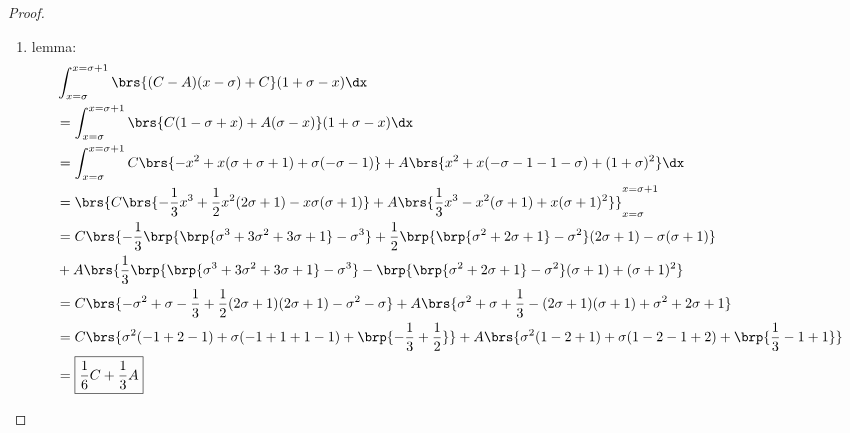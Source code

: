 \begin{proof}
\begin{enumerate}
  \item lemma: \label{ilem:stromberg_CA} 
    \begin{align*}
        &\int_{x=\sigma}^{x=\sigma+1}   \brs{ (C-A)(x-\sigma)+C           } (1+\sigma-x)    \dx
    \\&= \int_{x=\sigma}^{x=\sigma+1}   \brs{ C(1-\sigma+x) + A(\sigma-x) } (1+\sigma-x)    \dx
    \\&= \int_{x=\sigma}^{x=\sigma+1}  C\brs{-x^2 +  x(\sigma+\sigma+1) + \sigma(-\sigma-1)    } 
                                     + A\brs{ x^2 +  x(-\sigma-1-1-\sigma) + (1+\sigma)^2} \dx
    \\&= \brs{ C\brs{-\frac{1}{3}x^3 + \frac{1}{2} x^2(2\sigma+1) - x\sigma(\sigma+1)}
              +A\brs{ \frac{1}{3}x^3 -             x^2( \sigma+1) + x(\sigma+1)^2    } 
             }_{x=\sigma}^{x=\sigma+1}
    \\&= C\brs{-\frac{1}{3}\brp{\brp{\sigma^3+3\sigma^2+3\sigma+1}-\sigma^3} + \frac{1}{2}\brp{\brp{\sigma^2+2\sigma+1}-\sigma^2}(2\sigma+1) - \sigma(\sigma+1) }
    \\&+ A\brs{ \frac{1}{3}\brp{\brp{\sigma^3+3\sigma^2+3\sigma+1}-\sigma^3} -            \brp{\brp{\sigma^2+2\sigma+1}-\sigma^2}( \sigma+1) + (\sigma+1)^2     } 
    \\&= C\brs{-\sigma^2 + \sigma - \frac{1}{3} + \frac{1}{2}(2\sigma+1)(2\sigma+1) - \sigma^2 -\sigma }
       + A\brs{ \sigma^2 + \sigma + \frac{1}{3} - (2\sigma+1)( \sigma+1) + \sigma^2 + 2\sigma + 1      }
    \\&= C\brs{\sigma^2(-1+2-1) + \sigma(-1+1+1-1) + \brp{-\frac{1}{3}+\frac{1}{2}}}
       + A\brs{\sigma^2( 1-2+1) + \sigma( 1-2-1+2) + \brp{ \frac{1}{3}-1+1}}
    \\&= \boxed{\frac{1}{6}C + \frac{1}{3}A}
    \end{align*}


\end{enumerate}
\end{proof}
